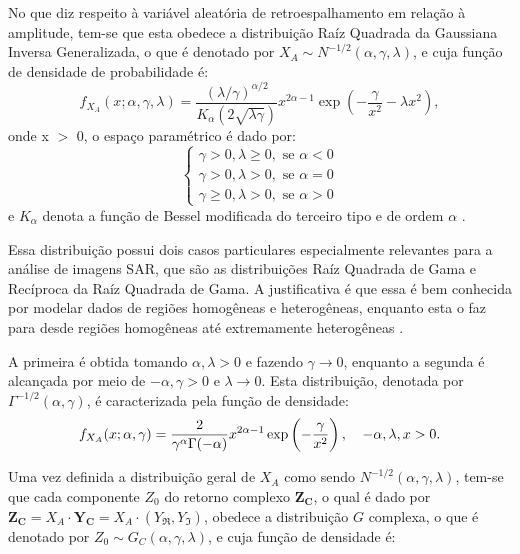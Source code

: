 \documentclass[12pt]{article}
\begin{document}
No que diz respeito à variável aleatória de retroespalhamento em relação à amplitude, tem-se que esta obedece a distribuição Raíz Quadrada da Gaussiana Inversa Generalizada, o que é denotado por $X_A \sim N^{-1/2}(\alpha, \gamma, \lambda)$, e cuja função de densidade de probabilidade é:
\begin{displaymath}
    f_{X_A}(x; \alpha, \gamma, \lambda) = \frac{(\lambda/\gamma)^{\alpha/2}}{K_{\alpha}(2\sqrt{\lambda\gamma})} x^{2\alpha - 1} \exp\left( -\frac{\gamma}{x^2} - \lambda x^2 \right),
\end{displaymath}
onde x $>$ 0, o espaço paramétrico é dado por:
\[
\begin{cases}
    \gamma > 0, \lambda \geq 0,\text{ se }\alpha < 0 \\
    \gamma > 0, \lambda > 0,\text{ se }\alpha = 0 \\
    \gamma \geq 0, \lambda > 0,\text{ se }\alpha > 0
\end{cases}
\]
e $K_\alpha$ denota a função de Bessel modificada do terceiro tipo e de ordem $\alpha$ \cite{frery97}.

Essa distribuição possui dois casos particulares especialmente relevantes para a análise de imagens SAR, que são as distribuições Raíz Quadrada de Gama e Recíproca da Raíz Quadrada de Gama. A justificativa é  que essa é bem conhecida por modelar dados de regiões homogêneas e heterogêneas, enquanto esta o faz para desde regiões homogêneas até extremamente heterogêneas \cite{frery97}.

A primeira é obtida tomando $\alpha, \lambda > 0$ e fazendo $\gamma \rightarrow 0$, enquanto a segunda é alcançada por meio de $-\alpha, \gamma > 0$ e $\lambda \rightarrow 0$. Esta distribuição, denotada por $\Gamma^{-1/2}(\alpha, \gamma)$, é caracterizada pela função de densidade:
\begin{displaymath}
    f_{X_A}(x; \alpha, \gamma) = \frac{2}{\gamma^{\alpha} \Gamma(-\alpha)} x^{2\alpha - 1} \exp\left(-\frac{\gamma}{x^2}\right), \hspace{0.03\linewidth} -\alpha, \lambda, x > 0.
\end{displaymath}

Uma vez definida a distribuição geral de $X_A$ como sendo $N^{-1/2}(\alpha, \gamma, \lambda)$, tem-se que cada componente $Z_0$ do retorno complexo $\mathbf{Z_C}$, o qual é dado por $\mathbf{Z_C} = X_A \cdot \mathbf{Y_C} = X_A \cdot (Y_{\Re}, Y_{\Im})$, obedece a distribuição $G$ complexa, o que é denotado por $Z_0 \sim G_C(\alpha, \gamma, \lambda)$, e cuja função de densidade é:
\end{document}
